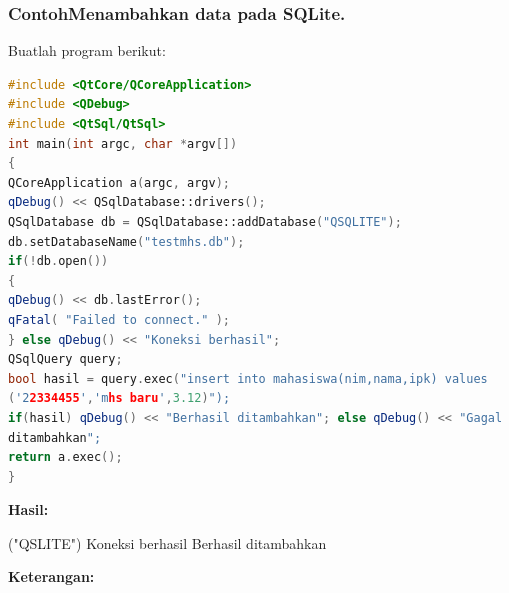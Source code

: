 \subsubsection*{ContohMenambahkan data pada SQLite.}

Buatlah program berikut:

\begin{lstlisting}[language=c++, caption= Menambahkan data pada SQLite]
#include <QtCore/QCoreApplication>
#include <QDebug>
#include <QtSql/QtSql>
int main(int argc, char *argv[])
{
QCoreApplication a(argc, argv);
qDebug() << QSqlDatabase::drivers();
QSqlDatabase db = QSqlDatabase::addDatabase("QSQLITE");
db.setDatabaseName("testmhs.db");
if(!db.open())
{
qDebug() << db.lastError();
qFatal( "Failed to connect." );
} else qDebug() << "Koneksi berhasil";
QSqlQuery query;
bool hasil = query.exec("insert into mahasiswa(nim,nama,ipk) values
('22334455','mhs baru',3.12)");
if(hasil) qDebug() << "Berhasil ditambahkan"; else qDebug() << "Gagal
ditambahkan";
return a.exec();
}
\end{lstlisting}

\textbf{Hasil:}

\begin{lcverbatim}
("QSLITE")
Koneksi berhasil
Berhasil ditambahkan
\end{lcverbatim}

\textbf{Keterangan:}

